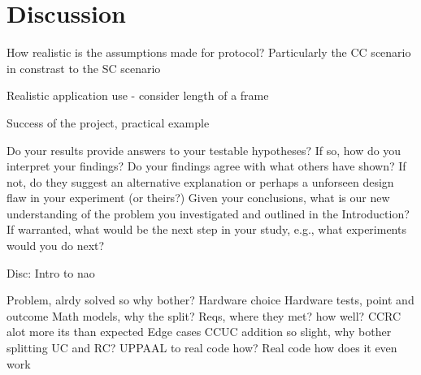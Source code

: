 \chapter{Discussion}
How realistic is the assumptions made for protocol? Particularly the CC scenario in constrast to the SC scenario

Realistic application use - consider length of a frame

Success of the project, practical example


Do your results provide answers to your testable hypotheses? If so, how do you interpret your findings?
Do your findings agree with what others have shown? If not, do they suggest an alternative explanation or perhaps a unforseen design flaw in your experiment (or theirs?)
Given your conclusions, what is our new understanding of the problem you investigated and outlined in the Introduction?
If warranted, what would be the next step in your study, e.g., what experiments would you do next?

Disc: Intro to nao

Problem, alrdy solved so why bother?
Hardware choice
Hardware tests, point and outcome
Math models, why the split?
Reqs, where they met? how well?
CCRC alot more its than expected
Edge cases
CCUC addition so slight, why bother splitting UC and RC?
UPPAAL to real code how?
Real code how does it even work
